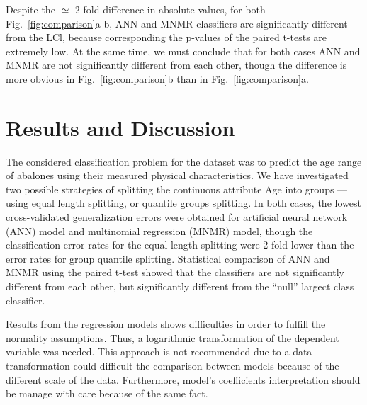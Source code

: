 \documentclass[10pt, paper=a4]{article}
\begin{document}
Despite the $\simeq$ 2-fold difference in absolute values, for both
Fig.~\ref{fig:comparison}a-b, ANN and MNMR classifiers are
significantly different from the LCl, because corresponding the
p-values of the paired t-tests are extremely low.  At the same time,
we must conclude that for both cases ANN and MNMR are not
significantly different from each other, though the difference is more
obvious in Fig.~\ref{fig:comparison}b than in
Fig.~\ref{fig:comparison}a.

\section{Results and Discussion}
\label{sec:results_and_discussion}

The considered classification problem for the dataset was to predict
the age range of abalones using their measured physical
characteristics.  We have investigated two possible strategies of
splitting the continuous attribute Age into groups --- using equal
length splitting, or quantile groups splitting.  In both cases, the
lowest cross-validated generalization errors were obtained for
artificial neural network (ANN) model and multinomial regression
(MNMR) model, though the classification error rates for the equal
length splitting were 2-fold lower than the error rates for group
quantile splitting.  Statistical comparison of ANN and MNMR using the
paired t-test showed that the classifiers are not significantly
different from each other, but significantly different from the
``null'' largect class classifier.

Results from the regression models shows difficulties in order to fulfill the normality assumptions. Thus, a logarithmic transformation of the dependent variable was needed. This approach is not recommended due to a data transformation could difficult the comparison between models because of the different scale of the data. Furthermore, model's coefficients interpretation should be manage with care because of the same fact.



\end{document}
